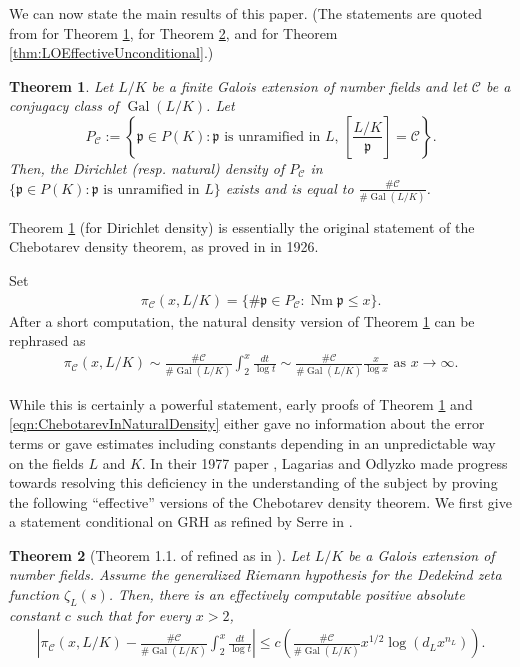 \documentclass[12pt]{amsart}
\newtheorem{thm}{Theorem}[section]
\theoremstyle{definition}
\theoremstyle{remark}
\numberwithin{equation}{section}
\newcommand{\cC}{\mathcal C}
\newcommand{\fkp}{\mathfrak p}
\DeclareMathOperator{\norm}{Nm}
\newcommand{\artin}[2]{\left[ \frac{#1}{#2}\right]}
\DeclareMathOperator{\Gal}{Gal}
\begin{document}
We can now state the main results of this paper. (The statements are quoted from \cite{FriedJarden08} for Theorem \ref{thm:ChebotarevInDirichletDensity}, \cite{Serre81} for Theorem \ref{thm:LOEffectiveConditional}, and \cite{LagariasOdlyzko77} for Theorem \ref{thm:LOEffectiveUnconditional}.)

\begin{thm} \label{thm:ChebotarevInDirichletDensity}
Let $L/K$ be a finite Galois extension of number fields and let $\cC$ be a conjugacy class of $\Gal(L/K)$. Let
\[
P_{\cC} := \left\{\fkp \in P(K): \fkp \text{ is unramified in $L$, } \artin{L/K}{\fkp} = \cC\right\}.
\]
Then, the Dirichlet (resp. natural) density of $P_{\cC}$ in $\{\fkp \in P(K): \fkp \text{ is unramified in } L\}$ exists and is equal to $\frac{\#\cC}{\# \Gal(L/K)}$.
\end{thm}

Theorem \ref{thm:ChebotarevInDirichletDensity} (for Dirichlet density) is essentially the original statement of the Chebotarev density theorem, as proved in \cite{Chebotarev26} in 1926.

Set
\begin{align}
\pi_{\cC}(x, L/K) = \{\# \fkp \in P_{\cC}: \norm \fkp \leq x\}.
\end{align}
After a short computation, the natural density version of Theorem \ref{thm:ChebotarevInDirichletDensity} can be rephrased as
\begin{align}\label{eqn:ChebotarevInNaturalDensity}
\pi_{\cC}(x,L/K) \sim \frac{\# \cC}{\# \Gal(L/K)} \int_{2}^{x} \frac{dt}{\log t} \sim \frac{\# \cC}{\# \Gal(L/K)} \frac{x}{\log x} \text{ as } x \to \infty.
\end{align}

While this is certainly a powerful statement, early proofs of Theorem \ref{thm:ChebotarevInDirichletDensity} and \eqref{eqn:ChebotarevInNaturalDensity} either gave no information about the error terms or gave estimates including constants depending in an unpredictable way on the fields $L$ and $K$. In their 1977 paper \cite{LagariasOdlyzko77}, Lagarias and Odlyzko made progress towards resolving this deficiency in the understanding of the subject by proving the following ``effective'' versions of the Chebotarev density theorem. We first give a statement conditional on GRH as refined by Serre in \cite{Serre81}.

\begin{thm}[Theorem 1.1. of \cite{LagariasOdlyzko77} refined as in \cite{Serre81}] \label{thm:LOEffectiveConditional}
Let $L/K$ be a Galois extension of number fields. Assume the generalized Riemann hypothesis for the Dedekind zeta function $\zeta_{L}(s)$. Then, there is an effectively computable positive absolute constant $c$ such that for every $x > 2$,
\begin{align}
\left| \pi_{\cC}(x, L/K) - \frac{\# \cC}{\# \Gal(L/K)} \int_{2}^{x} \frac{dt}{\log t} \right| \leq c \left( \frac{\# \cC}{\# \Gal(L/K)} x^{1/2} \log(d_{L} x^{n_{L}})\right).
\end{align}
\end{thm}
\end{document}
